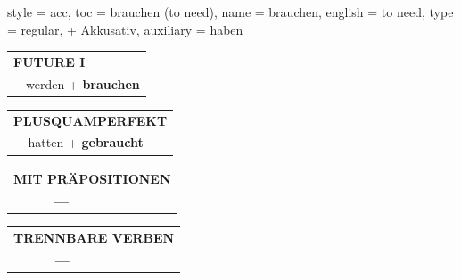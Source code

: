 \begin{verbentry}{
  style = {acc},
  toc = {brauchen (to need)},
  name = {brauchen},
  english = {to need},
  type = {regular, + Akkusativ},
  auxiliary = {haben}
}
\begin{tabular}{rl}
    \multicolumn{2}{l}{\textbf{FUTURE I} }\\
  &  werden + \textbf{brauchen}\\
 
  \end{tabular}
\hfill
   \begin{tabular}{rl}
      \multicolumn{2}{l}{\textbf{PLUSQUAMPERFEKT}}\\
  &  hatten + \textbf{gebraucht}\\
  \end{tabular}
  
  \vspace{10pt}

\begin{tabular}{lll}
\multicolumn{3}{l}{\textbf{MIT PRÄPOSITIONEN}}\\
& \textbf{---} & \\
\end{tabular}
\hfill
\begin{tabular}{lll}
\multicolumn{3}{l}{\textbf{TRENNBARE VERBEN}}\\
& \textbf{---} & \\
\end{tabular}

  \vspace{-5pt}
\end{verbentry}

